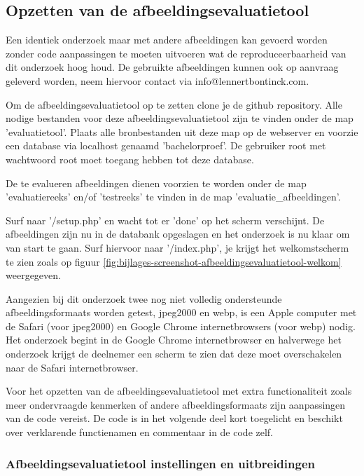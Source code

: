 \subsection{Opzetten van de afbeeldingsevaluatietool}
\label{sec:onderzoek-evaluatietool-setup}

Een identiek onderzoek maar met andere afbeeldingen kan gevoerd worden zonder code aanpassingen te moeten uitvoeren wat de reproduceerbaarheid van dit onderzoek hoog houd. De gebruikte afbeeldingen kunnen ook op aanvraag geleverd worden, neem hiervoor contact via info@lennertbontinck.com.

Om de \gls{afbeeldingsevaluatietool} op te zetten clone je de \gls{github} repository. Alle nodige bestanden voor deze \gls{afbeeldingsevaluatietool} zijn te vinden onder de map 'evaluatietool'. Plaats alle bronbestanden uit deze map op de webserver en voorzie een database via localhost genaamd 'bachelorproef'. De gebruiker root met wachtwoord root moet toegang hebben tot deze database. 

De te evalueren afbeeldingen dienen voorzien te worden onder de map 'evaluatiereeks' en/of 'testreeks' te vinden in de map 'evaluatie\_afbeeldingen'.

Surf naar '/setup.php' en wacht tot er 'done' op het scherm verschijnt. De afbeeldingen zijn nu in de databank opgeslagen en het onderzoek is nu klaar om van start te gaan. Surf hiervoor naar '/index.php', je krijgt het welkomstscherm te zien zoals op figuur \ref{fig:bijlages-screenshot-afbeeldingsevaluatietool-welkom} weergegeven.

Aangezien bij dit onderzoek twee nog niet volledig ondersteunde \glspl{afbeeldingsformaat} worden getest, \gls{jpeg2000} en \gls{webp}, is een Apple computer met de Safari (voor \gls{jpeg2000}) en Google Chrome internetbrowsers (voor \gls{webp}) nodig. Het onderzoek begint in de Google Chrome internetbrowser en halverwege het onderzoek krijgt de deelnemer een scherm te zien dat deze moet overschakelen naar de Safari internetbrowser.

Voor het opzetten van de \gls{afbeeldingsevaluatietool} met extra functionaliteit zoals meer ondervraagde kenmerken of andere \glspl{afbeeldingsformaat} zijn aanpassingen van de code vereist. De code is in het volgende deel kort toegelicht en beschikt over verklarende functienamen en commentaar in de code zelf. 

\subsubsection{Afbeeldingsevaluatietool instellingen en uitbreidingen}
\label{sec:onderzoek-evaluatietool-setup-database}

